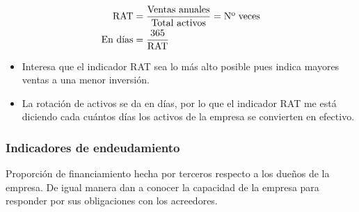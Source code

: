 \documentclass{templateNote}
\begin{document}
\begin{itemize}
    \begin{align*}
        \textnormal{RAT} &= \frac{\textnormal{Ventas anuales}}{\textnormal{Total activos}} = \textnormal{Nº veces} \\
        \textnormal{En días} &= \frac{365}{\textnormal{RAT}}
    \end{align*} 
    \begin{itemize}
        \item Interesa que el indicador RAT sea lo más alto posible pues indica mayores ventas a una menor inversión.
        \item La rotación de activos se da en días, por lo que el indicador RAT me está diciendo cada cuántos días los activos de la empresa se convierten en efectivo.
    \end{itemize}\end{itemize}

\subsubsection{Indicadores de endeudamiento}
\noindent Proporción de financiamiento hecha por terceros respecto a los dueños de la empresa. De igual manera dan a conocer la capacidad de la empresa para responder por 
sus obligaciones con los acreedores.
\end{document}
